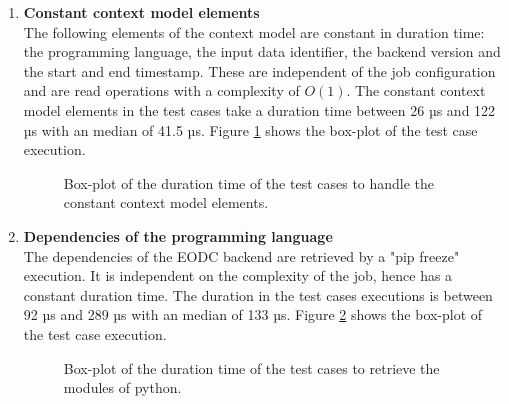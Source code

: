 \documentclass[draft,final]{vutinfth} %
\begin{document}
\begin{enumerate}
	\item \textbf{Constant context model elements} \\
	The following elements of the context model are constant in duration time: the programming language, the input data identifier, the backend version and the start and end timestamp. These are independent of the job configuration and are read operations with a complexity of $O(1)$. The constant context model elements in the test cases take a duration time between 26 µs and 122 µs with an median of 41.5 µs. Figure \ref{fig:evaluation_perf_static_cm} shows the box-plot of the test case execution.
	\begin{figure}[!h]
		\centering
		\caption{Box-plot of the duration time of the test cases to handle the constant context model elements.}
		\label{fig:evaluation_perf_static_cm}		
	\end{figure}
	\item \textbf{Dependencies of the programming language} \\
	The dependencies of the EODC backend are retrieved by a "pip freeze" execution. It is independent on the complexity of the job, hence has a constant duration time. The duration in the test cases executions is between 92 µs and 289 µs with an median of 133 µs. Figure \ref{fig:evaluation_perf_python} shows the box-plot of the test case execution.
	\begin{figure}[!h]
		\centering
		\caption{Box-plot of the duration time of the test cases to retrieve the modules of python.}
		\label{fig:evaluation_perf_python}		
\end{figure}
\end{enumerate}
\end{document}
